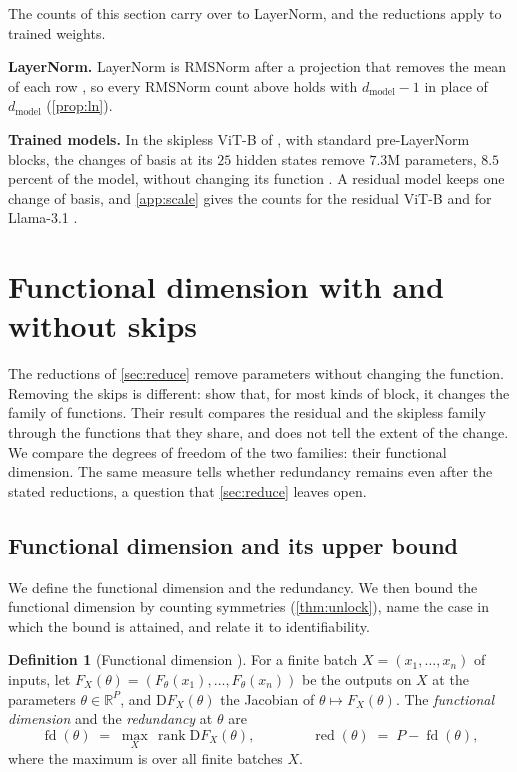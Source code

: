 \documentclass[10pt]{article}
\theoremstyle{definition}
\newtheorem{definition}[theorem]{Definition}
\theoremstyle{remark}
\newcommand{\R}{\mathbb{R}}
\newcommand{\dm}{d_{\mathrm{model}}}
\newcommand{\Der}{\mathrm{D}}
\newcommand{\para}[1]{\smallskip\noindent\textbf{#1}\hspace{0.5em}}
\begin{document}
The counts of this section carry over to LayerNorm, and the reductions apply to trained weights.

\para{LayerNorm.} LayerNorm is RMSNorm after a projection that removes the mean of each row \citep[for residual transformers]{jiang2023prermsnorm}, so every RMSNorm count above holds with $\dm - 1$ in place of $\dm$ (\cref{prop:ln}).

\para{Trained models.}\label{sec:trained} In the skipless ViT-B \citep{dosovitskiy2021an} of \citet{ji2026cutting}, with standard pre-LayerNorm blocks, the changes of basis at its $25$ hidden states remove $7.3$M parameters, $8.5$ percent of the model, without changing its function \citep{karbevski2026dimension}. A residual model keeps one change of basis, and \cref{app:scale} gives the counts for the residual ViT-B and for Llama-3.1 \citep{grattafiori2024llama3}.

\section{Functional dimension with and without skips}\label{sec:gain}
The reductions of \cref{sec:reduce} remove parameters without changing the function. Removing the skips is different: \citet{mijoski2026worth} show that, for most kinds of block, it changes the family of functions. Their result compares the residual and the skipless family through the functions that they share, and does not tell the extent of the change. We compare the degrees of freedom of the two families: their functional dimension. The same measure tells whether redundancy remains even after the stated reductions, a question that \cref{sec:reduce} leaves open.

\subsection{Functional dimension and its upper bound}\label{sec:fd}\label{sec:count}

We define the functional dimension and the redundancy. We then bound the functional dimension by counting symmetries (\cref{thm:unlock}), name the case in which the bound is attained, and relate it to identifiability.

\begin{definition}[Functional dimension {\citep{grigsby2022functional}}]\label{def:fd}
For a finite batch $X = (x_1, \dots, x_n)$ of inputs, let $F_X(\theta) = (F_\theta(x_1), \dots, F_\theta(x_n))$ be the outputs on $X$ at the parameters $\theta \in \R^P$, and $\Der F_X(\theta)$ the Jacobian of $\theta \mapsto F_X(\theta)$. The \emph{functional dimension} and the \emph{redundancy} at $\theta$ are
\[
\operatorname{fd}(\theta) \;=\; \max_{X}\, \operatorname{rank} \Der F_X(\theta), \qquad\qquad \operatorname{red}(\theta) \;=\; P - \operatorname{fd}(\theta),
\]
where the maximum is over all finite batches $X$.
\end{definition}
\end{document}
